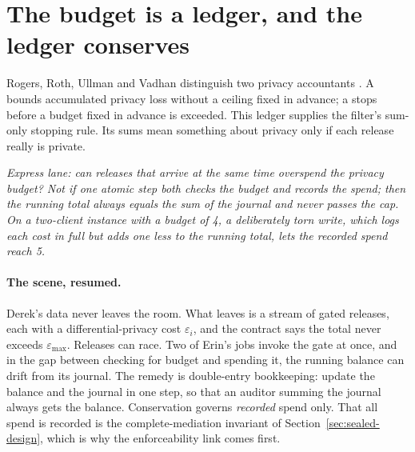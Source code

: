 \documentclass[11pt,a4paper]{article}
\theoremstyle{definition}
\begin{document}
\pdexercisepointerone{\ref{ex:sealed-compound}}{\pageref{ex:sealed-compound}}


\section{The budget is a ledger, and the ledger conserves}\label{sec:sealed-conservation}

\noindent Rogers, Roth, Ullman and Vadhan distinguish two privacy accountants
. A  bounds accumulated privacy loss
without a ceiling fixed in advance; a  stops before a
budget fixed in advance is exceeded. This ledger supplies the filter's
sum-only stopping rule. Its sums mean something about privacy only if each
release really is private.

\noindent\emph{Express lane: can releases that arrive at the same time
overspend the privacy budget? Not if one atomic step both checks the budget
and records the spend; then the running total always equals the sum of the
journal and never passes the cap. On a two-client instance with a budget of
4, a deliberately torn write, which logs each cost in full but adds one less
to the running total, lets the recorded spend reach 5.}

\paragraph{The scene, resumed.} %
Derek's data never leaves the room. What leaves is a stream of gated
releases, each with a differential-privacy cost $\varepsilon_i$, and the
contract says the total never exceeds $\varepsilon_{\max}$. Releases can
race. Two of Erin's jobs invoke the gate at once, and in the gap between
checking for budget and spending it, the running balance can drift from its
journal. The remedy is double-entry bookkeeping: update the balance and the
journal in one step, so that an auditor summing the journal always gets the
balance. Conservation governs \emph{recorded} spend only. That all spend is
recorded is the complete-mediation invariant of
Section~\ref{sec:sealed-design}, which is why the enforceability link comes
first.
\end{document}
